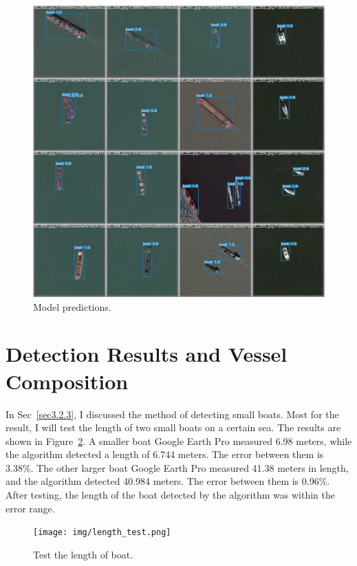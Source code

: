 \begin{figure}[h!]
    \centering
    \includegraphics[scale=0.33]{img/test_batch1_pred.jpg}
    \caption{Model predictions.}
    \label{fig:test_batch1_pred}
\end{figure}


\newpage
\section{Detection Results and Vessel Composition}

In Sec~\ref{sec3.2.3}, I discussed the method of detecting small boats. Most for the result, I will test the length of two small boats on a certain sea. The results are shown in Figure~\ref{fig:length_test}. A smaller boat Google Earth Pro measured 6.98 meters, while the algorithm detected a length of 6.744 meters. The error between them is 3.38\%. The other larger boat Google Earth Pro measured 41.38 meters in length, and the algorithm detected 40.984 meters. The error between them is 0.96\%. After testing, the length of the boat detected by the algorithm was within the error range.\\

\begin{figure}[h!]
    \centering
    \texttt{[image: img/length\_test.png]}
    \caption{Test the length of boat.}
    \label{fig:length_test}
\end{figure}



